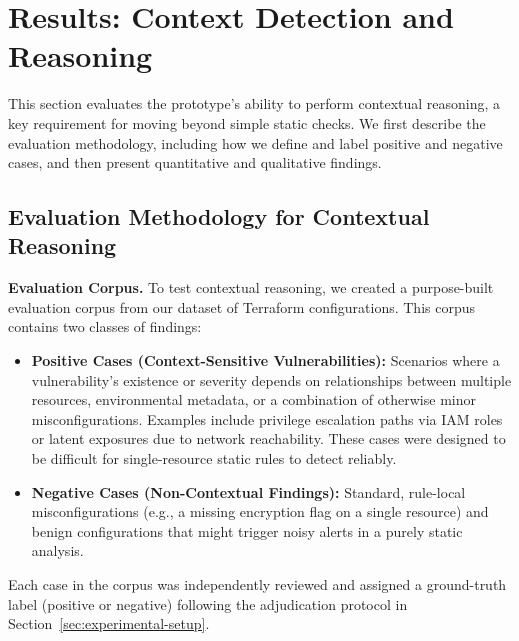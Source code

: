 \section{Results: Context Detection and Reasoning}\label{sec:results-context}

This section evaluates the prototype's ability to perform contextual reasoning, a key requirement for moving beyond simple static checks. We first describe the evaluation methodology, including how we define and label positive and negative cases, and then present quantitative and qualitative findings.

\subsection{Evaluation Methodology for Contextual Reasoning}

\textbf{Evaluation Corpus.} To test contextual reasoning, we created a purpose-built evaluation corpus from our dataset of Terraform configurations. This corpus contains two classes of findings:
\begin{itemize}
    \item \textbf{Positive Cases (Context-Sensitive Vulnerabilities):} Scenarios where a vulnerability's existence or severity depends on relationships between multiple resources, environmental metadata, or a combination of otherwise minor misconfigurations. Examples include privilege escalation paths via IAM roles or latent exposures due to network reachability. These cases were designed to be difficult for single-resource static rules to detect reliably.
    \item \textbf{Negative Cases (Non-Contextual Findings):} Standard, rule-local misconfigurations (e.g., a missing encryption flag on a single resource) and benign configurations that might trigger noisy alerts in a purely static analysis.
\end{itemize}
Each case in the corpus was independently reviewed and assigned a ground-truth label (positive or negative) following the adjudication protocol in Section~\ref{sec:experimental-setup}.

